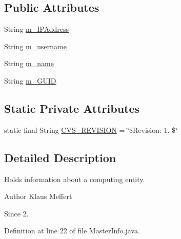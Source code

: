 \subsection*{Public Attributes}
\begin{DoxyCompactItemize}
\item 
String \hyperlink{classorg_1_1jgap_1_1distr_1_1_master_info_abc21071ddb29dafb7b784c4994df1b32}{m\-\_\-\-I\-P\-Address}
\item 
String \hyperlink{classorg_1_1jgap_1_1distr_1_1_master_info_adfc76742a11e2bb2d7a26bacd45ca011}{m\-\_\-username}
\item 
String \hyperlink{classorg_1_1jgap_1_1distr_1_1_master_info_ad36b22cc9f6de77bf9e14a150234db56}{m\-\_\-name}
\item 
String \hyperlink{classorg_1_1jgap_1_1distr_1_1_master_info_a836cdfff258f263824cdc3fd173ec409}{m\-\_\-\-G\-U\-I\-D}
\end{DoxyCompactItemize}
\subsection*{Static Private Attributes}
\begin{DoxyCompactItemize}
\item 
static final String \hyperlink{classorg_1_1jgap_1_1distr_1_1_master_info_a3153200de7efe89f2bc5500d9530656c}{C\-V\-S\-\_\-\-R\-E\-V\-I\-S\-I\-O\-N} = \char`\"{}\$Revision\-: 1. \$\char`\"{}
\end{DoxyCompactItemize}


\subsection{Detailed Description}
Holds information about a computing entity.

\begin{DoxyAuthor}{Author}
Klaus Meffert 
\end{DoxyAuthor}
\begin{DoxySince}{Since}
2. 
\end{DoxySince}


Definition at line 22 of file Master\-Info.\-java.



